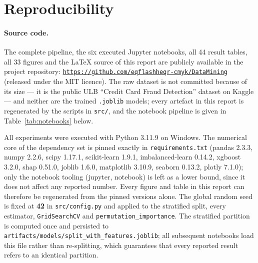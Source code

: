 \appendix
\section{Reproducibility}
\label{app:repro}

\paragraph{Source code.} The complete pipeline, the six executed Jupyter
notebooks, all 44 result tables, all 33 figures and the LaTeX source of this
report are publicly available in the project repository:
\href{https://github.com/eqflashheqr-cmyk/DataMining}{\texttt{https://github.com/eqflashheqr-cmyk/DataMining}}
(released under the MIT licence). The raw dataset is not committed because of
its size --- it is the public ULB ``Credit Card Fraud Detection'' dataset on
Kaggle --- and neither are the trained \texttt{.joblib} models; every artefact
in this report is regenerated by the scripts in \texttt{src/}, and the
notebook pipeline is given in Table~\ref{tab:notebooks} below.

All experiments were executed with Python 3.11.9 on Windows. The numerical
core of the dependency set is pinned exactly in \texttt{requirements.txt}
(pandas 2.3.3, numpy 2.2.6, scipy 1.17.1, scikit-learn 1.9.1,
imbalanced-learn 0.14.2, xgboost 3.2.0, shap 0.51.0, joblib 1.6.0,
matplotlib 3.10.9, seaborn 0.13.2, plotly 7.1.0); only the notebook tooling
(jupyter, notebook) is left as a lower bound, since it does not affect any
reported number. Every figure and table in this report can therefore be
regenerated from the pinned versions alone. The global random
seed is fixed at \textbf{42} in \texttt{src/config.py} and applied to the
stratified split, every estimator, \texttt{GridSearchCV} and
\texttt{permutation\_importance}. The stratified partition is computed once and
persisted to \texttt{artifacts/models/split\_with\_features.joblib}; all
subsequent notebooks load this file rather than re-splitting, which guarantees
that every reported result refers to an identical partition.


